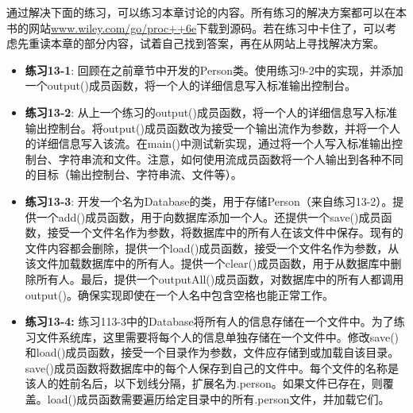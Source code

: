 通过解决下面的练习，可以练习本章讨论的内容。所有练习的解决方案都可以在本书的网站\url{www.wiley.com/go/proc++6e}下载到源码。若在练习中卡住了，可以考虑先重读本章的部分内容，试着自己找到答案，再在从网站上寻找解决方案。

\begin{itemize}
\item
\textbf{练习13-1}: 回顾在之前章节中开发的Person类。使用练习9-2中的实现，并添加一个output()成员函数，将一个人的详细信息写入标准输出控制台。

\item
\textbf{练习13-2}: 从上一个练习的output()成员函数，将一个人的详细信息写入标准输出控制台。将output()成员函数改为接受一个输出流作为参数，并将一个人的详细信息写入该流。在main()中测试新实现，通过将一个人写入标准输出控制台、字符串流和文件。注意，如何使用流成员函数将一个人输出到各种不同的目标（输出控制台、字符串流、文件等）。

\item
\textbf{练习13-3}: 开发一个名为Database的类，用于存储Person（来自练习13-2）。提供一个add()成员函数，用于向数据库添加一个人。还提供一个save()成员函数，接受一个文件名作为参数，将数据库中的所有人在该文件中保存。现有的文件内容都会删除，提供一个load()成员函数，接受一个文件名作为参数，从该文件加载数据库中的所有人。提供一个clear()成员函数，用于从数据库中删除所有人。最后，提供一个outputAll()成员函数，对数据库中的所有人都调用output()。确保实现即使在一个人名中包含空格也能正常工作。

\item
\textbf{练习13-4:} 练习113-3中的Database将所有人的信息存储在一个文件中。为了练习文件系统库，这里需要将每个人的信息单独存储在一个文件中。修改save()和load()成员函数，接受一个目录作为参数，文件应存储到或加载自该目录。save()成员函数将数据库中的每个人保存到自己的文件中。每个文件的名称是该人的姓前名后，以下划线分隔，扩展名为.person。如果文件已存在，则覆盖。load()成员函数需要遍历给定目录中的所有.person文件，并加载它们。
\end{itemize}

